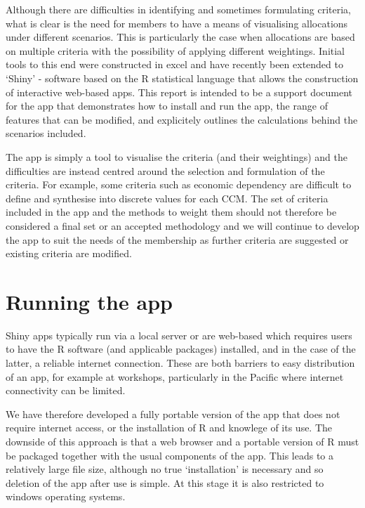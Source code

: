 \documentclass[11pt]{article}
\begin{document}
Although there are difficulties in identifying and sometimes formulating criteria, what is clear is the need for members to have a means of visualising allocations under different scenarios. This is particularly the case when allocations are based on multiple criteria with the possibility of applying different weightings. Initial tools to this end were constructed in excel and have recently been extended to `Shiny' - software based on the R statistical language that allows the construction of interactive web-based apps. This report is intended to be a support document for the app that demonstrates how to install and run the app, the range of features that can be modified, and explicitely outlines the calculations behind the scenarios included.

The app is simply a tool to visualise the criteria (and their weightings) and the difficulties are instead centred around the selection and formulation of the criteria. For example, some criteria such as economic dependency are difficult to define and synthesise into discrete values for each CCM. The set of criteria included in the app and the methods to weight them should not therefore be considered a final set or an accepted methodology and we will continue to develop the app to suit the needs of the membership as further criteria are suggested or existing criteria are modified.



\section{Running the app}
Shiny apps typically run via a local server or are web-based which requires users to have the R software (and applicable packages) installed, and in the case of the latter, a reliable internet connection. These are both barriers to easy distribution of an app, for example at workshops, particularly in the Pacific where internet connectivity can be limited.

We have therefore developed a fully portable version of the app that does not require internet access, or the installation of R and knowlege of its use. The downside of this approach is that a web browser and a portable version of R must be packaged together with the usual components of the app. This leads to a relatively large file size, although  no true `installation' is necessary and so deletion of the app after use is simple. At this stage it is also restricted to windows operating systems. 
\end{document}

